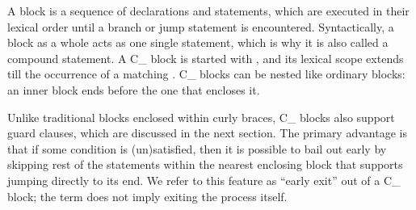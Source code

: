 A block is a sequence of declarations and statements, which are executed
in their lexical order until a branch or jump statement is encountered.
Syntactically, a block as a whole acts as one single statement,
which is why it is also called a compound statement.
A C\_ block is started with ,
and its lexical scope extends till the occurrence of a matching .
C\_ blocks can be nested like ordinary blocks:
an inner block ends before the one that encloses it.

Unlike traditional blocks enclosed within curly braces,
C\_ blocks also support guard clauses, which are discussed in the next section.
The primary advantage is that if some condition is (un)satisfied,
then it is possible to bail out early by skipping rest of the statements
within the nearest enclosing block that supports jumping directly to its end.
We refer to this feature as ``early exit'' out of a C\_ block;
the term does not imply exiting the process itself.
